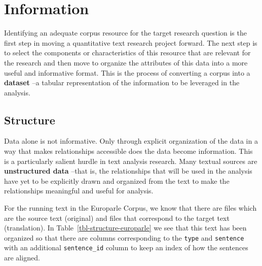 \documentclass[
  letterpaper,
]{scrbook}
\begin{document}
\hypertarget{information}{%
\section{Information}\label{information}}

Identifying an adequate corpus resource for the target research question
is the first step in moving a quantitative text research project
forward. The next step is to select the components or characteristics of
this resource that are relevant for the research and then move to
organize the attributes of this data into a more useful and informative
format. This is the process of converting a corpus into a
\textbf{dataset} --a tabular representation of the
information to be leveraged in the analysis.

\hypertarget{structure-1}{%
\subsection{Structure}\label{structure-1}}

Data alone is not informative. Only through explicit organization of the
data in a way that makes relationships accessible does the data become
information. This is a particularly salient hurdle in text analysis
research. Many textual sources are
\textbf{unstructured data} --that is, the
relationships that will be used in the analysis have yet to be
explicitly drawn and organized from the text to make the relationships
meaningful and useful for analysis.

For the running text in the Europarle Corpus, we know that there are
files which are the source text (original) and files that correspond to
the target text (translation). In Table~\ref{tbl-structure-europarle} we
see that this text has been organized so that there are columns
corresponding to the \texttt{type} and \texttt{sentence} with an
additional \texttt{sentence\_id} column to keep an index of how the
sentences are aligned.
\end{document}
